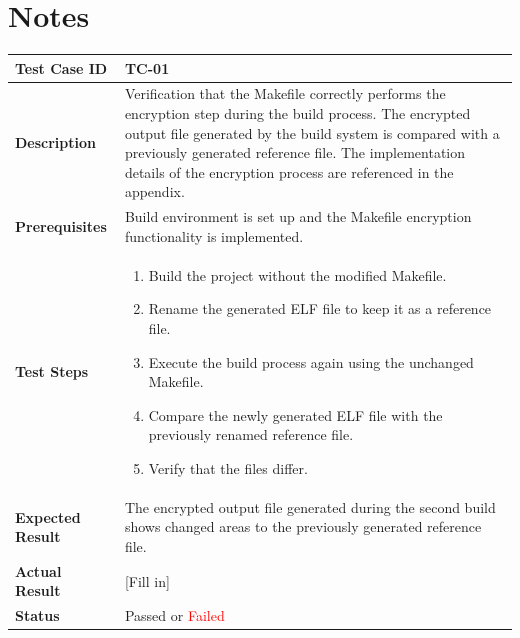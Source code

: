 \chapter{Notes}

\begin{table}[H]
\centering
\begin{tabular}{|p{3cm}|p{12cm}|}
\hline
\textbf{Test Case ID} & TC-01 \\ \hline
\textbf{Description} & Verification that the Makefile correctly performs the encryption step during the build process. The encrypted output file generated by the build system is compared with a previously generated reference file. The implementation details of the encryption process are referenced in the appendix. \\ \hline
\textbf{Prerequisites} & Build environment is set up and the Makefile encryption functionality is implemented. \\ \hline
\textbf{Test Steps} &
\begin{enumerate}
\item Build the project without the modified Makefile.
\item Rename the generated ELF file to keep it as a reference file.
\item Execute the build process again using the unchanged Makefile.
\item Compare the newly generated ELF file with the previously renamed reference file.
\item Verify that the files differ.
\end{enumerate}
\\ \hline
\textbf{Expected Result} & The encrypted output file generated during the second build shows changed areas to the previously generated reference file. \\ \hline
\textbf{Actual Result} & [Fill in] \\ \hline
\textbf{Status} & \textcolor{green!60!black}{Passed} or \textcolor{red}{Failed} \\ \hline
\end{tabular}
\end{table}

